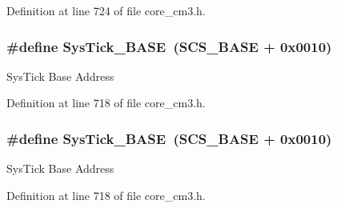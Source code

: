 Definition at line 724 of file core\+\_\+cm3.\+h.

\subsubsection[{\texorpdfstring{Sys\+Tick\+\_\+\+B\+A\+SE}{SysTick_BASE}}]{\setlength{\rightskip}{0pt plus 5cm}\#define Sys\+Tick\+\_\+\+B\+A\+SE~({\bf S\+C\+S\+\_\+\+B\+A\+SE} +  0x0010)}\hypertarget{group___c_m_s_i_s___c_m3__core__register_ga58effaac0b93006b756d33209e814646}{}\label{group___c_m_s_i_s___c_m3__core__register_ga58effaac0b93006b756d33209e814646}
Sys\+Tick Base Address 

Definition at line 718 of file core\+\_\+cm3.\+h.

\subsubsection[{\texorpdfstring{Sys\+Tick\+\_\+\+B\+A\+SE}{SysTick_BASE}}]{\setlength{\rightskip}{0pt plus 5cm}\#define Sys\+Tick\+\_\+\+B\+A\+SE~({\bf S\+C\+S\+\_\+\+B\+A\+SE} +  0x0010)}\hypertarget{group___c_m_s_i_s___c_m3__core__register_ga58effaac0b93006b756d33209e814646}{}\label{group___c_m_s_i_s___c_m3__core__register_ga58effaac0b93006b756d33209e814646}
Sys\+Tick Base Address 

Definition at line 718 of file core\+\_\+cm3.\+h.


